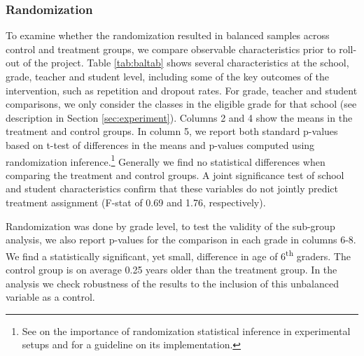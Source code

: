 \documentclass[11pt,a4paper]{article}
\begin{document}
\subsubsection*{Randomization}
To examine whether the randomization resulted in balanced samples across control and treatment groups, we compare observable characteristics prior to roll-out of the project. Table \ref{tab:baltab} shows several characteristics at the school, grade, teacher and student level, including some of the key outcomes of the intervention, such as repetition and dropout rates. For grade, teacher and student comparisons, we only consider the classes in the eligible grade for that school (see description in Section \ref{sec:experiment}). Columns 2 and 4 show the means in the treatment and control groups. In column 5, we report both standard p-values based on t-test of differences in the means and p-values computed using randomization inference.\footnote{See \cite{young2019channelling} on the importance of randomization statistical inference in experimental setups and \cite{hess2017randomization} for a guideline on its implementation.} Generally we find no statistical differences when comparing the treatment and control groups. A joint significance test of school and student characteristics confirm that these variables do not jointly predict treatment assignment (F-stat of 0.69 and 1.76, respectively).

Randomization was done by grade level, to test the validity of the sub-group analysis, we also report p-values for the comparison in each grade in columns 6-8. We find a statistically significant, yet small, difference in age of 6\textsuperscript{th} graders. The control group is on average 0.25 years older than the treatment group. In the analysis we check robustness of the results to the inclusion of this unbalanced variable as a control.
\end{document}
